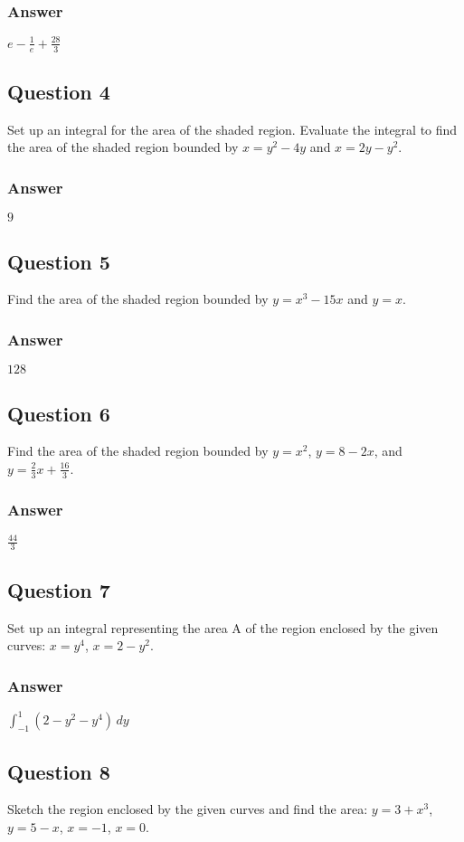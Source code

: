 \documentclass{article}
\begin{document}
\subsubsection*{Answer}
$ e - \frac{1}{e} + \frac{28}{3} $

\subsection*{Question 4}
Set up an integral for the area of the shaded region. Evaluate the integral to find the area of the shaded region bounded by $x=y^2-4y$ and $x=2y-y^2$.
\subsubsection*{Answer}
$ 9 $

\subsection*{Question 5}
Find the area of the shaded region bounded by $y=x^3-15x$ and $y=x$.
\subsubsection*{Answer}
$ 128 $

\subsection*{Question 6}
Find the area of the shaded region bounded by $y=x^2$, $y=8-2x$, and $y = \frac{2}{3}x + \frac{16}{3}$.
\subsubsection*{Answer}
$ \frac{44}{3} $

\subsection*{Question 7}
Set up an integral representing the area A of the region enclosed by the given curves: $x=y^4$, $x=2-y^2$.
\subsubsection*{Answer}
$ \int_{-1}^{1} (2-y^2-y^4) \,dy $

\subsection*{Question 8}
Sketch the region enclosed by the given curves and find the area: $y=3+x^3$, $y=5-x$, $x=-1$, $x=0$.
\end{document}

